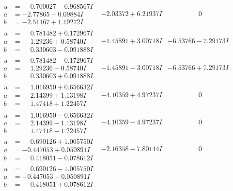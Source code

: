 \documentclass[1p]{elsarticle_modified}
\theoremstyle{definition}
\begin{document}
$$\begin{array}{c|c|c}
\begin{aligned}
u &= \phantom{-}0.700027 - 0.968567 I \\
a &= -2.77865 - 0.09884 I \\
b &= -2.51167 + 1.19272 I\end{aligned}
 & -2.03372 + 6.21937 I & \phantom{-0.000000 } 0 \\ \hline\begin{aligned}
u &= \phantom{-}0.781482 + 0.172967 I \\
a &= \phantom{-}1.29236 + 0.58740 I \\
b &= \phantom{-}0.330603 - 0.091888 I\end{aligned}
 & -1.45891 + 3.00718 I & -6.53766 - 7.29173 I \\ \hline\begin{aligned}
u &= \phantom{-}0.781482 - 0.172967 I \\
a &= \phantom{-}1.29236 - 0.58740 I \\
b &= \phantom{-}0.330603 + 0.091888 I\end{aligned}
 & -1.45891 - 3.00718 I & -6.53766 + 7.29173 I \\ \hline\begin{aligned}
u &= \phantom{-}1.016950 + 0.656632 I \\
a &= \phantom{-}2.14399 + 1.13198 I \\
b &= \phantom{-}1.47418 + 1.22457 I\end{aligned}
 & -4.10359 + 4.97237 I & \phantom{-0.000000 } 0 \\ \hline\begin{aligned}
u &= \phantom{-}1.016950 - 0.656632 I \\
a &= \phantom{-}2.14399 - 1.13198 I \\
b &= \phantom{-}1.47418 - 1.22457 I\end{aligned}
 & -4.10359 - 4.97237 I & \phantom{-0.000000 } 0 \\ \hline\begin{aligned}
u &= \phantom{-}0.690126 + 1.005750 I \\
a &= -0.447053 + 0.050891 I \\
b &= \phantom{-}0.418051 - 0.078612 I\end{aligned}
 & -2.16358 - 7.80144 I & \phantom{-0.000000 } 0 \\ \hline\begin{aligned}
u &= \phantom{-}0.690126 - 1.005750 I \\
a &= -0.447053 - 0.050891 I \\
b &= \phantom{-}0.418051 + 0.078612 I\end{aligned}

\end{array}$$
\end{document}
